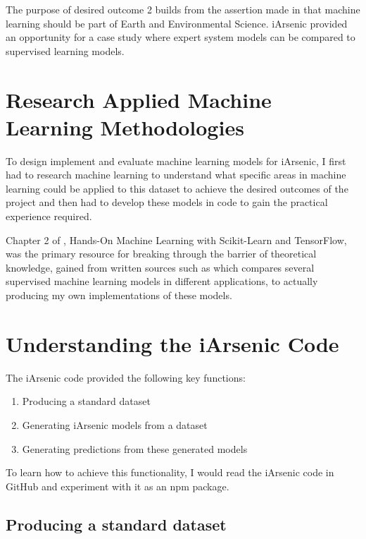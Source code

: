 The purpose of desired outcome 2 builds from the assertion made in \cite{Fleming2021} that machine learning should be part of Earth and Environmental Science. iArsenic provided an opportunity for a case study where expert system models can be compared to supervised learning models. 

\section{Research Applied Machine Learning Methodologies}

To design implement and evaluate machine learning models for iArsenic, I first had to research machine learning to understand what specific areas in machine learning could be applied to this dataset to achieve the desired outcomes of the project and then had to develop these models in code to gain the practical experience required.

Chapter 2 of \cite{Aurélien2017}, Hands-On Machine Learning with Scikit-Learn and TensorFlow, was the primary resource for breaking through the barrier of theoretical knowledge, gained from written sources such as \cite{Caruana2006} which compares several supervised machine learning models in different applications, to actually producing my own implementations of these models.

\section{Understanding the iArsenic Code}

The iArsenic code provided the following key functions:

\begin{enumerate}
  \label{ia_functions}
  \item Producing a standard dataset
  \item Generating iArsenic models from a dataset
  \item Generating predictions from these generated models
\end{enumerate}

To learn how to achieve this functionality, I would read the iArsenic code in GitHub and experiment with it as an npm package.

\subsection{Producing a standard dataset}

